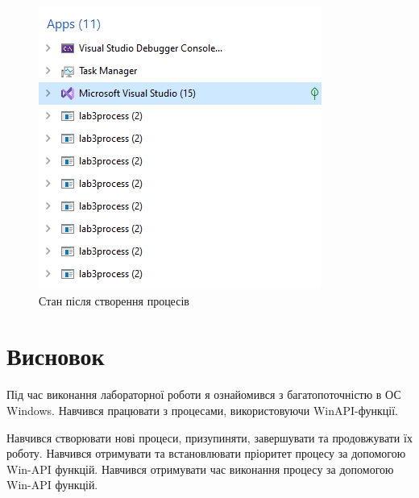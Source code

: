 \documentclass{article}
\begin{document}
\begin{normalsize}
	\begin{figure}[H]
		\centering
		\includegraphics[scale=0.7]{after}
		\caption{Стан після створення процесів}
	\end{figure}
	
	\section*{Висновок}
	Під час виконання лабораторної роботи я ознайомився з багатопоточністю в ОС Windows. Навчився працювати з процесами, використовуючи WinAPI-функції. 
	
	Навчився створювати нові процеси, призупиняти, завершувати та продовжувати їх роботу.
	Навчився отримувати та встановлювати пріоритет процесу за допомогою Win-API функцій.
	Навчився отримувати час виконання процесу за допомогою Win-API функцій.
	
	 
\end{normalsize}
\end{document}
